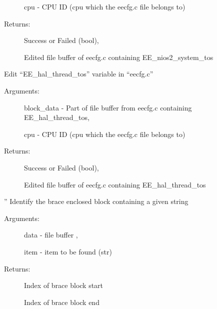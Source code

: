 \documentclass[letterpaper,10pt,english]{sphinxmanual}
\begin{document}
\begin{fulllineitems}
\begin{fulllineitems}
\begin{description}
cpu - CPU ID (cpu which the eecfg.c file belongs to)

\item[{Returns:}] \leavevmode
Success or Failed (bool),

Edited file buffer of eecfg.c containing EE\_nios2\_system\_tos

\end{description}

\end{fulllineitems}


\begin{fulllineitems}
\label{\detokenize{code:FlexTool.FlexTool._FlexTool__editThreadTos}}
Edit “EE\_hal\_thread\_tos” variable in “eecfg.c”
\begin{description}
\item[{Arguments:}] \leavevmode
block\_data - Part of file buffer from eecfg.c containing EE\_hal\_thread\_tos,

cpu - CPU ID (cpu which the eecfg.c file belongs to)

\item[{Returns:}] \leavevmode
Success or Failed (bool),

Edited file buffer of eecfg.c containing EE\_hal\_thread\_tos

\end{description}

\end{fulllineitems}


\begin{fulllineitems}
\label{\detokenize{code:FlexTool.FlexTool._FlexTool__findBraceBlock}}
”
Identify the brace enclosed block containing a given string
\begin{description}
\item[{Arguments: }] \leavevmode
data - file buffer ,

item - item to be found (str)

\item[{Returns:}] \leavevmode
Index of brace block start

Index of brace block end


\end{description}
\end{fulllineitems}
\end{fulllineitems}
\end{document}
